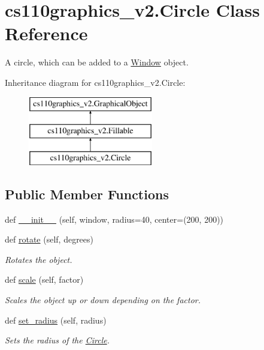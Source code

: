 \hypertarget{classcs110graphics__v2_1_1Circle}{}\section{cs110graphics\+\_\+v2.\+Circle Class Reference}
\label{classcs110graphics__v2_1_1Circle}


A circle, which can be added to a \mbox{\hyperlink{classcs110graphics__v2_1_1Window}{Window}} object.  


Inheritance diagram for cs110graphics\+\_\+v2.\+Circle\+:\begin{figure}[H]
\begin{center}
\leavevmode
\includegraphics[height=3.000000cm]{classcs110graphics__v2_1_1Circle}
\end{center}
\end{figure}
\subsection*{Public Member Functions}
\begin{DoxyCompactItemize}
\item 
def \mbox{\hyperlink{classcs110graphics__v2_1_1Circle_a9bfef66909748005c888b307bc99db5f}{\+\_\+\+\_\+init\+\_\+\+\_\+}} (self, window, radius=40, center=(200, 200))
\item 
def \mbox{\hyperlink{classcs110graphics__v2_1_1Circle_aabea5d516684d384910e7309ed0aba31}{rotate}} (self, degrees)
\begin{DoxyCompactList}\small\item\em Rotates the object. \end{DoxyCompactList}\item 
def \mbox{\hyperlink{classcs110graphics__v2_1_1Circle_a4a04c8a0ec27e30f3fd5af5fe428423b}{scale}} (self, factor)
\begin{DoxyCompactList}\small\item\em Scales the object up or down depending on the factor. \end{DoxyCompactList}\item 
def \mbox{\hyperlink{classcs110graphics__v2_1_1Circle_a6aeb2c3a3c3a77d1b4b6fa3ad62a114a}{set\+\_\+radius}} (self, radius)
\begin{DoxyCompactList}\small\item\em Sets the radius of the \mbox{\hyperlink{classcs110graphics__v2_1_1Circle}{Circle}}. \end{DoxyCompactList}\end{DoxyCompactItemize}


